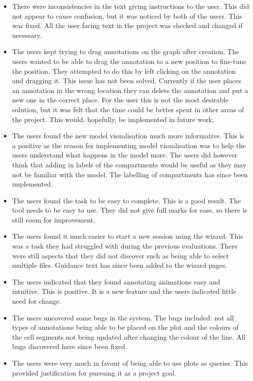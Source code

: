 \begin{itemize}
\item There were inconsistencies in the text giving instructions to the user.  This did not appear to cause confusion, but it was noticed by both of the users.  This was fixed.  All the user facing text in the project was checked and changed if necessary.
\item The users kept trying to drag annotations on the graph after creation. The users wanted to be able to drag the annotation to a new position to fine-tune the position.  They attempted to do this by left clicking on the annotation and dragging it.  This issue has not been solved.  Currently if the user places an annotation in the wrong location they can delete the annotation and put a new one in the correct place.  For the user this is not the most desirable solution, but it was felt that the time could be better spent in other areas of the project.  This would, hopefully, be implemented in future work.
\item The users found the new model visualisation much more informative.  This is a positive as the reason for implementing model visualisation was to help the users understand what happens in the model more.  The users did however think that adding in labels of the compartments would be useful as they may not be familiar with the model.  The labelling of compartments has since been implemented.
\item The users found the task to be easy to complete.  This is a good result.  The tool needs to be easy to use.  They did not give full marks for ease, so there is still room for improvement.
\item The users found it much easier to start a new session using the wizard.  This was a task they had struggled with during the previous evaluations.  There were still aspects that they did not discover such as being able to select multiple files.  Guidance text has since been added to the wizard pages.
\item The users indicated that they found annotating animations easy and intuitive.  This is positive.  It is a new feature and the users indicated little need for change.
\item The users uncovered some bugs in the system.  The bugs included: not all types of annotations being able to be placed on the plot and the colours of the cell segments not being updated after changing the colour of the line.  All bugs discovered have since been fixed.
\item The users were very much in favour of being able to use plots as queries.  This provided justification for pursuing it as a project goal.

\end{itemize}

